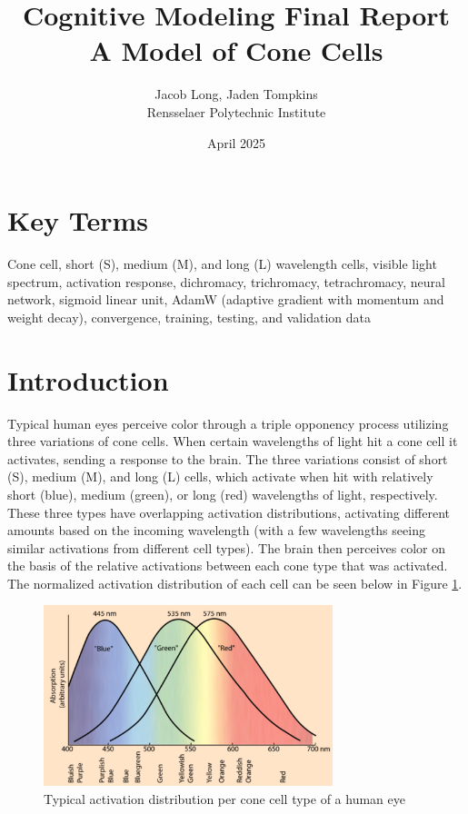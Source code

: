 \documentclass[titlepage]{article}
\title{\Huge Cognitive Modeling Final Report\\\huge A Model of Cone Cells}
\author{\LARGE Jacob Long, Jaden Tompkins\\\large Rensselaer Polytechnic Institute}
\date{\Large April 2025}
\begin{document}
\maketitle

\section*{Key Terms}
Cone cell, short (S), medium (M), and long (L) wavelength cells, visible light spectrum, activation response, dichromacy, trichromacy, tetrachromacy, neural network, sigmoid linear unit, AdamW (adaptive gradient with momentum and weight decay), convergence, training, testing, and validation data

\section{Introduction}
Typical human eyes perceive color through a triple opponency process \cite{colorvision} utilizing three variations of cone cells. When certain wavelengths of light hit a cone cell it activates, sending a response to the brain. The three variations consist of short (S), medium (M), and long (L) cells, which activate when hit with relatively short (blue), medium (green), or long (red) wavelengths of light, respectively. These three types have overlapping activation distributions, activating different amounts based on the incoming wavelength (with a few wavelengths seeing similar activations from different cell types). The brain then perceives color on the basis of the relative activations between each cone type that was activated. The normalized activation distribution of each cell can be seen below in Figure \ref{fig:typical_activation_distribution}.


\begin{figure}[H]
    \centering
    \includegraphics[width=0.75\textwidth]{figs/distribution.png}
    \caption{Typical activation distribution per cone cell type of a human eye \cite{coneinfo}}
    \label{fig:typical_activation_distribution}
\end{figure}
\end{document}
